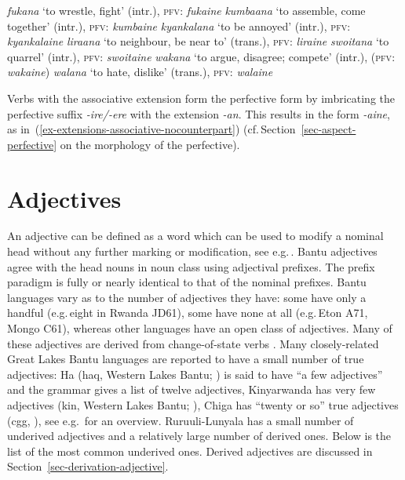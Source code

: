 \ea \label{ex-extensions-associative-nocounterpart}
\begin{xlist}
\ex \textit{fukana} `to wrestle, fight' (intr.), \textsc{pfv}: \textit{fukaine}
\ex \textit{kumbaana} `to assemble, come together' (intr.), \textsc{pfv}: \textit{kumbaine}
\ex \textit{kyankalana} `to be annoyed' (intr.), \textsc{pfv}: \textit{kyankalaine}
\ex \textit{liraana} `to neighbour, be near to' (trans.), \textsc{pfv}: \textit{liraine}
\ex \textit{swoitana} `to quarrel' (intr.), \textsc{pfv}: \textit{swoitaine}
\ex \textit{wakana} `to argue, disagree; compete' (intr.), 
(\textsc{pfv}: \textit{wakaine})
\ex \textit{walana} `to hate, dislike' (trans.), \textsc{pfv}: \textit{walaine}
\end{xlist}
\z

Verbs with the associative extension form the perfective form by imbricating the perfective suffix \textit{-ire/-ere} with the extension \textit{-an}. This results in the form \textit{-aine}, as in~(\ref{ex-extensions-associative-nocounterpart}) (cf.\,Section~\ref{sec-aspect-perfective} on the morphology of the perfective).

\section{Adjectives}\label{sec-adjectives}

An adjective can be defined as a word which can be used to modify a nominal head without any further marking or modification, see e.g.\,\citet[58]{Hengeveld1992Non-verbal}. 
Bantu adjectives agree with the head nouns in noun class using adjectival prefixes. 
The prefix paradigm is fully or nearly identical to that of the nominal prefixes. 
Bantu languages vary as to the number of adjectives they have: some have only a handful (e.g.\,eight in Rwanda JD61), some have none at all (e.g.\,Eton A71, Mongo C61), whereas other languages have an open class of adjectives. 
Many of these adjectives are derived from change-of-state verbs \citep[258]{Vandeveldeetal2019Nominal}. 
Many closely-related Great Lakes Bantu languages are reported to have a small number of true adjectives: Ha (haq, Western Lakes Bantu; \citealt[76]{Harjula2004Ha}) is said to have ``a few adjectives” and the grammar gives a list of twelve adjectives, Kinyarwanda has very few adjectives (kin, Western Lakes Bantu; \citealt[231]{Kimenyi1980Relational}), Chiga has “twenty or so” true adjectives (cgg, \citealt[49]{Taylor1985Nkore-Kiga}), see e.g.\,\citet{Segerer2008Closed} for an overview. 
Ru\-ruu\-li\hyp{}Lu\-nya\-la has a small number of underived adjectives and a relatively large number of derived ones. Below is the list of the most common underived ones. 
Derived adjectives are discussed in Section~\ref{sec-derivation-adjective}.

